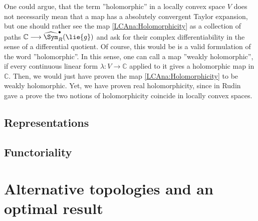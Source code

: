 \begin{remark}
	\label{LCAna:Rem:Holomorphicity}
	One could argue, that the term ''holomorphic'' in a locally convex space 
	$V$ does not necessarily mean that a map has a absolutely convergent 
	Taylor expansion, but one should rather see the map 
	\eqref{LCAna:Holomorphicity} as a collection of paths $\mathbb{C} 
	\longrightarrow \widehat{\Sym}_R^{\bullet}(\lie{g})$ and ask for their 
	complex differentiability in the sense of a differential quotient. Of 
	course, this would be is a valid formulation of the word ''holomorphic''. 
	In this sense, one can call a map ''weakly holomorphic'', if every 
	continuous linear form $\lambda \colon V \longrightarrow \mathbb{C}$
	applied to it gives a holomorphic map in $\mathbb{C}$. Then, we would just 
	have proven the map \eqref{LCAna:Holomorphicity} to be weakly holomorphic.
	Yet, we have proven real holomorphicity, since in \cite{Rudin:blue} Rudin 
	gave a prove the two notions of holomorphicity coincide in locally convex 
	spaces.
\end{remark}



\subsection{Representations}



\subsection{Functoriality}



\section{Alternative topologies and an optimal result}
\label{sec:chap5_Functoriality}

